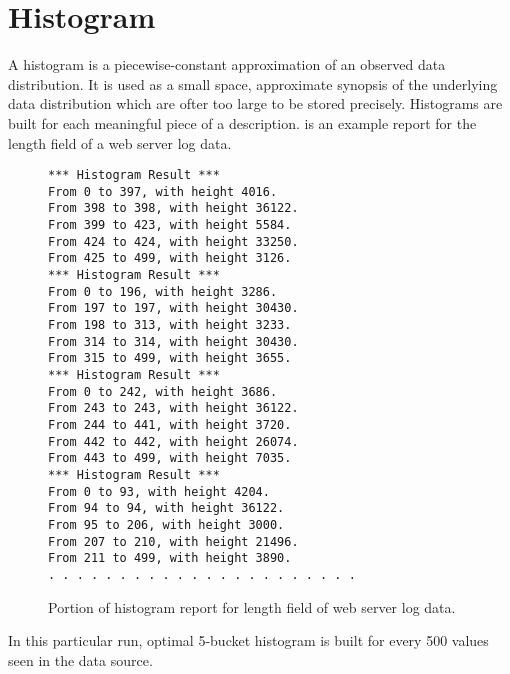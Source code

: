\chapter{Histogram}
\label{chap:histogram}

A histogram is a piecewise-constant approximation of an observed 
data distribution. It is used as a small space, approximate
synopsis of the underlying data distribution which are ofter too
large to be stored precisely. Histograms are built for each meaningful 
piece of a \pads{} description. 
is an example report for the length field of a web server log data.     
%
\begin{figure*}
\begin{small}
\begin{verbatim}
*** Histogram Result *** 
From 0 to 397, with height 4016. 
From 398 to 398, with height 36122. 
From 399 to 423, with height 5584. 
From 424 to 424, with height 33250. 
From 425 to 499, with height 3126. 
*** Histogram Result *** 
From 0 to 196, with height 3286. 
From 197 to 197, with height 30430. 
From 198 to 313, with height 3233. 
From 314 to 314, with height 30430. 
From 315 to 499, with height 3655. 
*** Histogram Result *** 
From 0 to 242, with height 3686. 
From 243 to 243, with height 36122. 
From 244 to 441, with height 3720. 
From 442 to 442, with height 26074. 
From 443 to 499, with height 7035. 
*** Histogram Result *** 
From 0 to 93, with height 4204. 
From 94 to 94, with height 36122. 
From 95 to 206, with height 3000. 
From 207 to 210, with height 21496. 
From 211 to 499, with height 3890. 
. . . . . . . . . . . . . . . . . . . . . . 
\end{verbatim}
\end{small}
\caption{Portion of histogram report for length field of web server
log data.}
\label{figure:wsl-hist-report-1}
\end{figure*}
%
In this particular run, optimal 5-bucket histogram is built for 
every 500 values seen in the data source.

